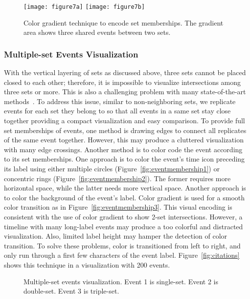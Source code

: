 \begin{figure}[ht]
	\centering
		{\texttt{[image: figure7a]}}\label{fig:gradient1}
	\hfill
		{\texttt{[image: figure7b]}}\label{fig:gradient2}
	\caption{Color gradient technique to encode set memberships. The gradient area shows three shared events between two sets.}
	\label{fig:gradient}
\end{figure}

\subsubsection{Multiple-set Events Visualization}
With the vertical layering of sets as discussed above, three sets cannot be placed closed to each other; therefore, it is impossible to visualize intersections among three sets or more. This is also a challenging problem with many state-of-the-art methods~\cite{Alsallakh2014}. To address this issue, similar to non-neighboring sets, we replicate events for each set they belong to so that all events in a same set stay close together providing a compact visualization and easy comparison. To provide full set memberships of events, one method is drawing edges to connect all replicates of the same event together. However, this may produce a cluttered visualization with many edge crossings. Another method is to color code the event according to its set memberships. One approach is to color the event's time icon preceding its label using either multiple circles (Figure~\ref{fig:eventmembership1}) or concentric rings (Figure~\ref{fig:eventmembership2}). The former requires more horizontal space, while the latter needs more vertical space. Another approach is to color the background of the event's label. Color gradient is used for a smooth color transition as in Figure~\ref{fig:eventmembership3}. This visual encoding is consistent with the use of color gradient to show 2-set intersections. However, a timeline with many long-label events may produce a too colorful and distracted visualization. Also, limited label height may hamper the detection of color transition. To solve these problems, color is transitioned from left to right, and only run through a first few characters of the event label. Figure~\ref{fig:citations} shows this technique in a visualization with 200 events.

\begin{figure}[ht]
	\centering
	\hfill
	\hfill
	\caption{Multiple-set events visualization. Event 1 is single-set. Event 2 is double-set. Event 3 is triple-set.}
	\label{fig:eventmembership}
\end{figure}

